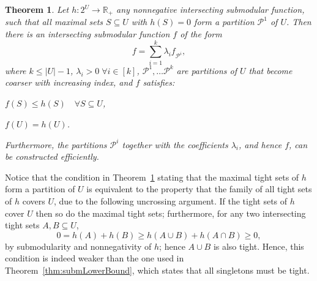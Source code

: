 \documentclass[11pt, letterpaper]{article}
\newtheorem{theorem}{Theorem}[section]
\theoremstyle{definition}
\begin{document}
\begin{theorem}\label{thm:strongSubmLowerBound}
Let $h:2^U\rightarrow \mathbb{R}_+$ any nonnegative
intersecting submodular function, such that all maximal
sets $S\subseteq U$ with $h(S)=0$ form a partition
$\mathcal{P}^1$ of $U$.
Then there is an intersecting submodular function $f$ of the form
\begin{equation*}
f = \sum_{i=1}^k \lambda_i f_{\mathcal{P}^i},
\end{equation*}
where $k\leq |U|-1$, $\lambda_i> 0 \;\forall i\in [k]$, 
$\mathcal{P}^1,\dots \mathcal{P}^k$ are partitions of $U$ that
become coarser with increasing index, and $f$
satisfies:
\begin{compactenum}[i)]
\item\label{item:lowerBound} $f(S) \leq h(S) \quad \forall S\subseteq U$,
\item\label{item:matchR} $f(U)=h(U)$.
\end{compactenum}
Furthermore, the partitions $\mathcal{P}^i$ together with the coefficients
$\lambda_i$, and hence $f$, can be constructed efficiently.
\end{theorem}

Notice that the condition in Theorem~\ref{thm:strongSubmLowerBound}
stating that the maximal tight sets of $h$ form
a partition of $U$ is equivalent to the property that the family of all
tight sets of $h$ covers $U$, due to the following uncrossing argument.
If the tight sets of $h$ cover $U$ then so
do the maximal tight sets; furthermore, for any two intersecting tight sets $A,B\subseteq U$, 
\begin{equation*}
0= h(A)+h(B) \geq h(A\cup B) + h(A\cap B) \geq 0,
\end{equation*}
by submodularity and nonnegativity of $h$; hence $A\cup B$ is also tight.
Hence, this condition is indeed weaker than the one used 
in Theorem~\ref{thm:submLowerBound}, which states that all singletons
must be tight.
\end{document}

